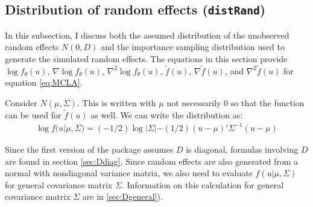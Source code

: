 \documentclass{article}
\begin{document}
%
%
%


\subsection{Distribution of random effects (\texttt{distRand})}\label{sec:distRand}


In this subsection, I discuss both the assumed distribution of the unobserved random effects $N(0,D)$ and the importance sampling distribution used to generate the simulated random effects.  The equations in this section provide  $\log f_\theta(u)$, $\nabla \log f_\theta(u)$,  $\nabla^2 \log f_\theta(u)$, $\tilde{f}(u)$, $ \nabla \tilde{f}(u)$, and $\nabla^2 \tilde{f}(u)$  for equation \ref{eq:MCLA}. 

Consider $N(\mu, \Sigma)$.  This is written with $\mu$ not necessarily $0$ so that the function can be used for $\tilde{f}(u)$ as well.  We can  write the distribution  as:
\begin{align}
\log f (u| \mu, \Sigma) = (-1/2) \log |\Sigma| - (1/2) (u-\mu)' \Sigma^{-1} (u-\mu)
\end{align}

Since the first version of the package assumes $D$ is diagonal, formulas involving $D$ are found in section \ref{sec:Ddiag}.  
Since random effects are also generated from a normal with nondiagonal variance matrix, we also need to evaluate $f(u|\mu,\Sigma)$ for general covariance matrix $\Sigma$. Information on this calculation for general covariance matrix $\Sigma$ are in \ref{sec:Dgeneral}).
\end{document}
